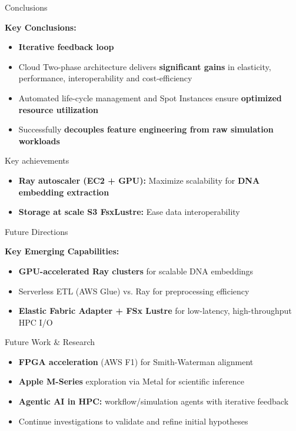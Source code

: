 \documentclass[aspectratio=169]{beamer}
\begin{document}
\begin{frame}{Conclusions}
    
            \textbf{Key Conclusions:}
            \begin{itemize}
                \item \textbf{Iterative feedback loop} 
                \item Cloud Two-phase architecture delivers \textbf{significant gains} in elasticity, performance, interoperability and cost-efficiency
                \item Automated life-cycle management and Spot Instances ensure {\textbf{optimized resource utilization}}
                \item Successfully \textbf{decouples feature engineering from raw simulation workloads}
                
            \end{itemize}
        
    
    \vspace{0.3cm}
    \begin{block}{Key achievements}
        \begin{itemize}
            \item \textbf{Ray autoscaler (EC2 + GPU):} Maximize scalability for \textbf{DNA embedding extraction}
            \item \textbf{Storage at scale S3 FsxLustre:} Ease data interoperability
        \end{itemize}
    \end{block}
\end{frame}

\begin{frame}{Future Directions}


    \textbf{Key Emerging Capabilities:}
    \begin{itemize}
        \item \textcolor{rayblue}{\textbf{GPU-accelerated Ray clusters}} for scalable DNA embeddings
        \item Serverless ETL (AWS Glue) vs. Ray for preprocessing efficiency
        \item \textbf{Elastic Fabric Adapter + FSx Lustre} for low-latency, high-throughput HPC I/O
    \end{itemize}

    \vspace{0.3cm}
    \begin{block}{Future Work \& Research}
        \begin{itemize}
            \item \textbf{FPGA acceleration} (AWS F1) for Smith-Waterman alignment
            \item \textbf{Apple M-Series} exploration via Metal for scientific inference
            \item \textbf{Agentic AI in HPC:} workflow/simulation agents with iterative feedback
            \item Continue investigations to validate and refine initial hypotheses
        \end{itemize}
    \end{block}
\end{frame}
\end{document}
